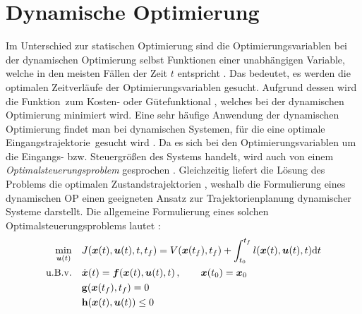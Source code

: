 \section{Dynamische Optimierung}\label{sec:dynamischeOpt}
Im Unterschied zur statischen Optimierung sind die Optimierungsvariablen bei der dynamischen Optimierung selbst Funktionen einer unabhängigen Variable, welche in den meisten Fällen der Zeit $t$ entspricht \cite{KnutGraichen.2012}. Das bedeutet, es werden die optimalen Zeitverläufe der Optimierungsvariablen gesucht. Aufgrund dessen wird die Funktion \fofx\,zum Kosten- oder Gütefunktional \J, welches bei der dynamischen Optimierung minimiert wird. Eine sehr häufige Anwendung der dynamischen Optimierung findet man bei dynamischen Systemen, für die eine optimale Eingangstrajektorie \uoptoft\,gesucht wird \cite{KnutGraichen.2012}. Da es sich bei den Optimierungsvariablen um die Eingangs- bzw. Steuergrößen des Systems handelt, wird auch von einem \textit{Optimalsteuerungsproblem} gesprochen \cite{KnutGraichen.2012}. Gleichzeitig liefert die Lösung des Problems die optimalen Zustandstrajektorien \xoptoft, weshalb die Formulierung eines dynamischen \gls{OP} einen geeigneten Ansatz zur Trajektorienplanung dynamischer Systeme darstellt. 
Die allgemeine Formulierung eines solchen Optimalsteuerungsproblems lautet \cite{KnutGraichen.2012}:
\begin{align}
\min_{\boldsymbol{u}(t)} \quad &J(\boldsymbol{x}(t),\boldsymbol{u}(t),t,t_f) = V(\boldsymbol{x}(t_f),t_f) + \int_{t_0}^{t_f}l(\boldsymbol{x}(t),\boldsymbol{u}(t),t)\textrm{d}{t} \label{eq:J_dyn}\\
\textrm{u.B.v.} \quad& \dot{\boldsymbol{x}}(t) = \boldsymbol{f}(\boldsymbol{x}(t),\boldsymbol{u}(t),t)\,,\qquad \boldsymbol{x}(t_0) = \boldsymbol{x}_0 \label{eq:system_anfang}\\
&\mathbf{g}(\boldsymbol{x}(t_f),t_f) = 0 \label{eq:GNB}\\
&\mathbf{h}(\boldsymbol{x}(t),\boldsymbol{u}(t)) \leq 0 \label{eq:UNB}
\end{align}
